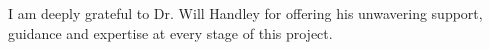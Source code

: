 \documentclass[%
 reprint,
 amsmath,amssymb,
 aps,
]{revtex4-2}
\begin{document}
\begin{acknowledgments}
I am deeply grateful to Dr. Will Handley for offering his unwavering support, guidance and expertise at every stage of this project.
\end{acknowledgments}






\end{document}
